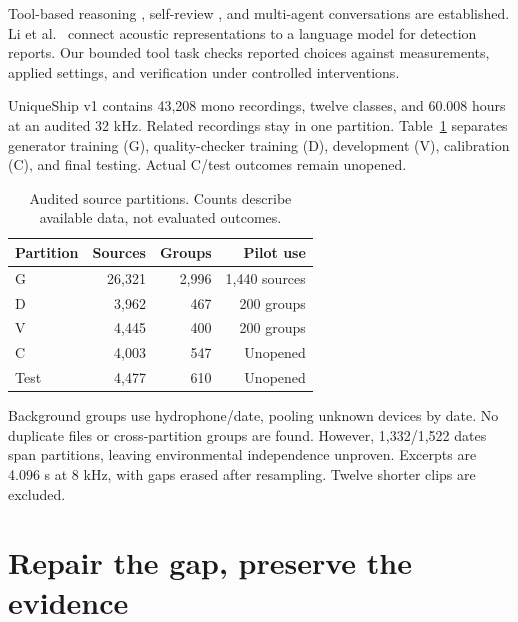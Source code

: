 \documentclass[runningheads,orivec]{llncs}
\begin{document}
Tool-based reasoning \cite{react}, self-review \cite{reflexion}, and multi-agent conversations \cite{autogen} are established. Li et al.\ \cite{signals_evidence} connect acoustic representations to a language model for detection reports. Our bounded tool task checks reported choices against measurements, applied settings, and verification under controlled interventions.

UniqueShip v1 \cite{uniqueship} contains 43,208 mono recordings, twelve classes, and 60.008 hours at an audited 32 kHz. Related recordings stay in one partition. Table~\ref{tab:1} separates generator training (G), quality-checker training (D), development (V), calibration (C), and final testing. Actual C/test outcomes remain unopened.

\begin{table}[htbp]
\caption{Audited source partitions. Counts describe available data, not evaluated outcomes.}
\label{tab:1}
\centering\small
\begin{tabular*}{\linewidth}{@{\extracolsep{\fill}}lrrr@{}}
\toprule

\textbf{Partition} & \textbf{Sources} & \textbf{Groups} & \textbf{Pilot use} \\

\midrule

G & 26,321 & 2,996 & 1,440 sources \\

D & 3,962 & 467 & 200 groups \\

V & 4,445 & 400 & 200 groups \\

C & 4,003 & 547 & Unopened \\

Test & 4,477 & 610 & Unopened \\

\bottomrule
\end{tabular*}
\end{table}

Background groups use hydrophone/date, pooling unknown devices by date. No duplicate files or cross-partition groups are found. However, 1,332/1,522 dates span partitions, leaving environmental independence unproven. Excerpts are 4.096 s at 8 kHz, with gaps erased after resampling. Twelve shorter clips are excluded.

\section{Repair the gap, preserve the evidence}
\end{document}
